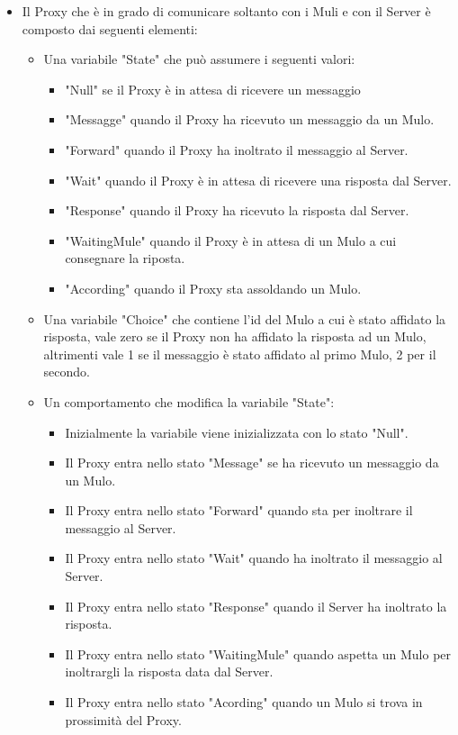 \documentclass[13pt,a4paper]{article}
\begin{document}
\begin{itemize}
		
		\item Il Proxy che è in grado di comunicare soltanto con i Muli e con il Server è composto dai seguenti elementi: 
		\begin{itemize}
			\item Una variabile "State" che può assumere i seguenti valori:
			\begin{itemize}
				\item "Null" se il Proxy è in attesa di ricevere un messaggio
				\item "Messagge" quando il Proxy ha ricevuto un messaggio da un Mulo.
				\item "Forward" quando il Proxy ha inoltrato il messaggio al Server.
				\item "Wait" quando il Proxy è in attesa di ricevere una risposta dal Server.
				\item "Response" quando il Proxy ha ricevuto la risposta dal Server.
				\item "WaitingMule" quando il Proxy è in attesa di un Mulo a cui consegnare la riposta. 
				\item "According" quando il Proxy sta assoldando un Mulo.
			\end{itemize}
		\item Una variabile "Choice" che contiene l'id del Mulo a cui è stato affidato la risposta, vale zero se il Proxy non ha  affidato la risposta ad un Mulo, altrimenti vale 1 se il messaggio è stato affidato al primo Mulo, 2 per il secondo.
		\item Un comportamento che modifica la variabile "State":
		\begin{itemize}
			\item Inizialmente la variabile viene inizializzata con lo stato "Null".
			\item Il Proxy entra nello stato "Message" se ha ricevuto un messaggio da un Mulo.
			\item Il Proxy entra nello stato "Forward" quando sta per inoltrare il messaggio al Server.
			\item Il Proxy entra nello stato "Wait" quando ha inoltrato il messaggio al Server.
			\item Il Proxy entra nello stato "Response" quando il Server ha inoltrato la risposta.
			\item Il Proxy entra nello stato "WaitingMule" quando aspetta un Mulo per inoltrargli la risposta data dal Server.
			\item Il Proxy entra nello stato "Acording" quando un Mulo si trova in prossimità del Proxy.

\end{itemize}
\end{itemize}
\end{itemize}
\end{document}
